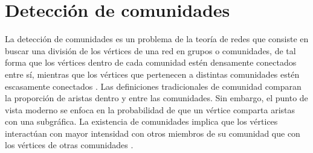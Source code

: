 




\section{Detección de comunidades}

La detección de comunidades es un problema de la teoría de redes que consiste en buscar una división de los vértices de una red en grupos o comunidades, de tal forma que los vértices dentro de cada comunidad estén densamente conectados entre sí, mientras que los vértices que pertenecen a distintas comunidades estén escasamente conectados \parencite[p.~2]{Blondel2008}.  Las definiciones tradicionales de comunidad comparan la proporción de aristas dentro y entre las comunidades. Sin embargo, el punto de vista moderno se enfoca en la probabilidad de que un vértice comparta aristas con una subgráfica. La existencia de comunidades implica que los vértices interactúan con mayor intensidad con otros miembros de su comunidad que con los vértices de otras comunidades \parencite[p.~7]{Fortunato2016}.

